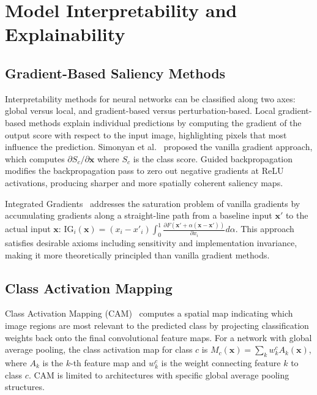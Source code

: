 \section{Model Interpretability and Explainability}

\subsection{Gradient-Based Saliency Methods}

Interpretability methods for neural networks can be classified along two axes: global versus local, and gradient-based versus perturbation-based. Local gradient-based methods explain individual predictions by computing the gradient of the output score with respect to the input image, highlighting pixels that most influence the prediction. Simonyan et al.~\cite{simonyan2013deep} proposed the vanilla gradient approach, which computes $\partial S_c / \partial \mathbf{x}$ where $S_c$ is the class score. Guided backpropagation~\cite{springenberg2014striving} modifies the backpropagation pass to zero out negative gradients at ReLU activations, producing sharper and more spatially coherent saliency maps.

Integrated Gradients~\cite{sundararajan2017axiomatic} addresses the saturation problem of vanilla gradients by accumulating gradients along a straight-line path from a baseline input $\mathbf{x}'$ to the actual input $\mathbf{x}$: $\text{IG}_i(\mathbf{x}) = (x_i - x'_i) \int_0^1 \frac{\partial F(\mathbf{x}' + \alpha(\mathbf{x}-\mathbf{x}'))}{\partial x_i} d\alpha$. This approach satisfies desirable axioms including sensitivity and implementation invariance, making it more theoretically principled than vanilla gradient methods.

\subsection{Class Activation Mapping}

Class Activation Mapping (CAM)~\cite{zhou2016learning} computes a spatial map indicating which image regions are most relevant to the predicted class by projecting classification weights back onto the final convolutional feature maps. For a network with global average pooling, the class activation map for class $c$ is $M_c(\mathbf{x}) = \sum_k w_k^c A_k(\mathbf{x})$, where $A_k$ is the $k$-th feature map and $w_k^c$ is the weight connecting feature $k$ to class $c$. CAM is limited to architectures with specific global average pooling structures.

